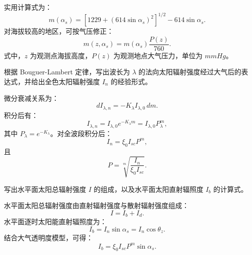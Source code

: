 \begin{solution}
实用计算式为：
\begin{equation}
m(\alpha_s)
= \left[1229 + (614\sin\alpha_s)^2\right]^{1/2}
- 614\sin\alpha_s.
\end{equation}
对海拔较高的地区，可按气压修正：
\begin{equation}
m(z,\alpha_s)
= m(\alpha_s)\frac{P(z)}{760}.
\end{equation}
式中，\(z\) 为观测点海拔高度，\(P(z)\) 为观测地点大气压力，单位为 \(\unit{mmHg}\)。
\end{solution}

\begin{problem}[大气透明度与法向太阳辐射强度]\label{exer:calc_04_solar_p029_01}
根据 Bouguer-Lambert 定律，写出波长为 \(\lambda\) 的法向太阳辐射强度经过大气后的表达式，并给出全色太阳辐射强度 \(I_n\) 的经验形式。
\end{problem}

\begin{solution}
微分衰减关系为：
\begin{equation}
dI_{\lambda,n} = -K_\lambda I_{\lambda,0}\,dm.
\end{equation}
积分后有：
\begin{equation}
I_{\lambda,n} = I_{\lambda,0}e^{-K_\lambda m}
= I_{\lambda,0}P_\lambda^m,
\end{equation}
其中 \(P_\lambda = e^{-K_\lambda}\)。对全波段积分后：
\begin{equation}
I_n = \xi_0 I_{sc}P^m,
\end{equation}
且
\begin{equation}
P = \sqrt[m]{\frac{I_n}{\xi_0 I_{sc}}}.
\end{equation}
\end{solution}

\begin{problem}[水平面直射辐照度]\label{exer:calc_04_solar_p031_01}
写出水平面太阳总辐射强度 \(I\) 的组成，以及水平面太阳直射辐照度 \(I_b\) 的计算式。
\end{problem}

\begin{solution}
水平面太阳总辐射强度由直射辐射强度与散射辐射强度组成：
\begin{equation}
I = I_b + I_d.
\end{equation}
水平面逐时太阳能直射辐照度为：
\begin{equation}
I_b = I_n\sin\alpha_s = I_n\cos\theta_z.
\end{equation}
结合大气透明度模型，可得：
\begin{equation}
I_b = \xi_0 I_{sc}P^m\sin\alpha_s.
\end{equation}
\end{solution}

